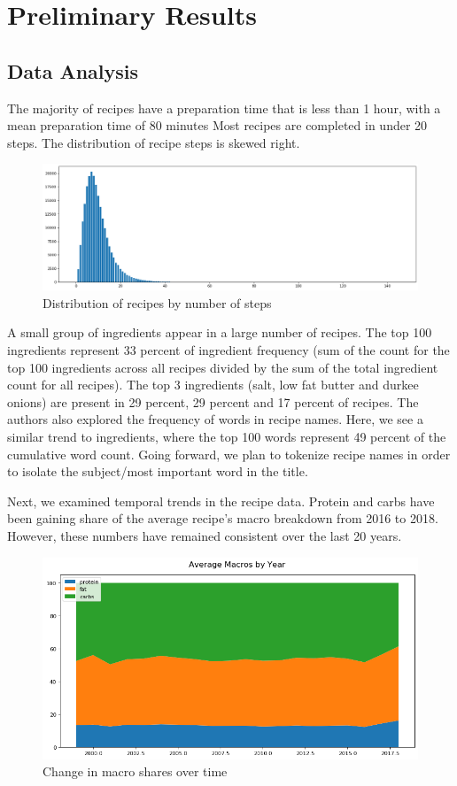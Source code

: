 \documentclass[sigconf]{acmart}
\begin{document}
\section{Preliminary Results}
\subsection{Data Analysis}
The majority of recipes have a preparation time that is less than 1 hour, with a mean preparation time of 80 minutes Most recipes are completed in under 20 steps. The distribution of recipe steps is skewed right.

\begin{figure}[h]
  \centering
  \includegraphics[width=\linewidth]{steps.png}
  \caption{Distribution of recipes by number of steps}
\end{figure}

A small group of ingredients appear in a large number of recipes. The top 100 ingredients represent 33 percent of ingredient frequency (sum of the count for the top 100 ingredients across all recipes divided by the sum of the total ingredient count for all recipes). The top 3 ingredients (salt, low fat butter and durkee onions) are present in 29 percent, 29 percent and 17 percent of recipes. The authors also explored the frequency of words in recipe names. Here, we see a similar trend to ingredients, where the top 100 words represent 49 percent of the cumulative word count. Going forward, we plan to tokenize recipe names in order to isolate the subject/most important word in the title.

Next, we examined temporal trends in the recipe data. Protein and carbs have been gaining share of the average recipe's macro breakdown from 2016 to 2018. However, these numbers have remained consistent over the last 20 years. 

\begin{figure}[h]
  \centering
  \includegraphics[width=\linewidth]{macros.png}
  \caption{Change in macro shares over time}
\end{figure}
\end{document}
